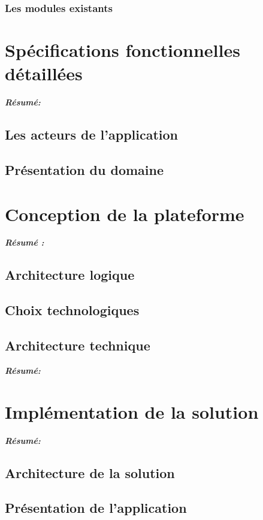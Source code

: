 \documentclass[a4paper, 12pt]{report}
\begin{document}
\subsection{Les modules existants}


\chapter{Spécifications fonctionnelles détaillées}
\textit{\textbf{Résumé:}}
\setcounter{minitocdepth}{2}
\minitoc
\section{Les acteurs de l'application}
\section{Présentation du domaine}


\chapter{Conception de la plateforme}
\textit{\textbf{Résumé : }}
\setcounter{minitocdepth}{1}
\minitoc
\newpage
\section{Architecture logique}

\section{Choix technologiques}

\section{Architecture technique}


\textit{\textbf{Résumé:} }
\minitoc
\newpage

\chapter{Implémentation de la solution}

\textit{\textbf{Résumé:} }
\minitoc
\newpage
\section{Architecture de la solution}
\section{Présentation de l'application}
\end{document}

